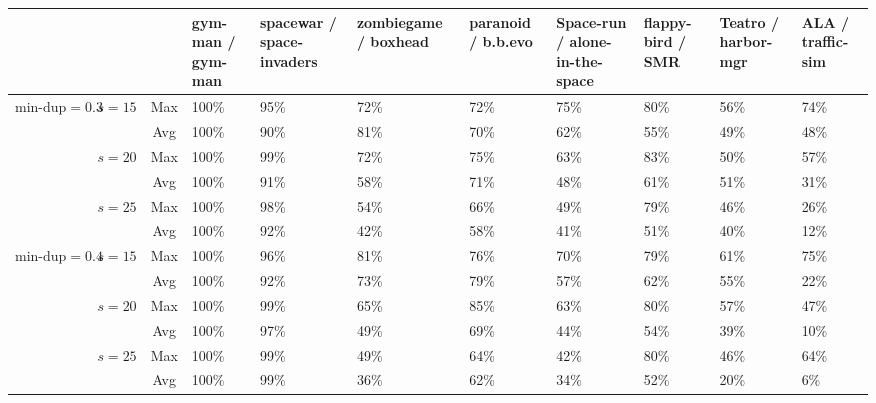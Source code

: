 \begin{landscape}
    \begin{table}[h!]
        \centering
        \begin{tabular}{ c|c|c|p{1cm}|p{1.5cm}|p{2cm}|p{1.5cm}|p{1.5cm}|p{1.5cm}|p{1.5cm}|p{1.2cm} }
            \multicolumn{3}{c|}{} & gym-man / gym-man & spacewar / space-invaders & zombiegame / boxhead & paranoid / b.b.evo & Space-run / alone-in-the-space & flappy-bird / SMR & Teatro / harbor-mgr & ALA / traffic-sim \\ [0.5ex]
            \hline\hline
            \multirow{6}{*}{$\text{min-dup}=0.3$} & \multirow{2}{*}{$s=15$} & Max & 100\% & 95\% & 72\% & 72\% & 75\% & 80\% & 56\% & 74\% \\
            & & Avg & 100\% & 90\% & 81\% & 70\% & 62\% & 55\% & 49\% & 48\% \\
            & \multirow{2}{*}{$s=20$} & Max & 100\% & 99\% & 72\% & 75\% & 63\% & 83\% & 50\% & 57\% \\
            & & Avg & 100\% & 91\% & 58\% & 71\% & 48\% & 61\% & 51\% & 31\% \\
            & \multirow{2}{*}{$s=25$} & Max & 100\% & 98\% & 54\% & 66\% & 49\% & 79\% & 46\% & 26\% \\
            & & Avg & 100\% & 92\% & 42\% & 58\% & 41\% & 51\% & 40\% & 12\% \\
            \hline

            \multirow{6}{*}{$\text{min-dup}=0.4$} & \multirow{2}{*}{$s=15$} & Max & 100\% & 96\% & 81\% & 76\% & 70\% & 79\% & 61\% & 75\% \\
            & & Avg & 100\% & 92\% & 73\% & 79\% & 57\% & 62\% & 55\% & 22\% \\
            & \multirow{2}{*}{$s=20$} & Max & 100\% & 99\% & 65\% & 85\% & 63\% & 80\% & 57\% & 47\% \\
            & & Avg & 100\% & 97\% & 49\% & 69\% & 44\% & 54\% & 39\% & 10\% \\
            & \multirow{2}{*}{$s=25$} & Max & 100\% & 99\% & 49\% & 64\% & 42\% & 80\% & 46\% & 64\% \\
            & & Avg & 100\% & 99\% & 36\% & 62\% & 34\% & 52\% & 20\% & 6\% \\
            \hline


\end{tabular}
\end{table}
\end{landscape}
